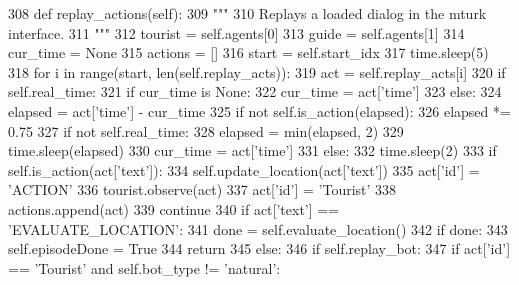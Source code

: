 \begin{DoxyCode}
308     \textcolor{keyword}{def }replay\_actions(self):
309         \textcolor{stringliteral}{"""}
310 \textcolor{stringliteral}{        Replays a loaded dialog in the mturk interface.}
311 \textcolor{stringliteral}{        """}
312         tourist = self.agents[0]
313         guide = self.agents[1]
314         cur\_time = \textcolor{keywordtype}{None}
315         actions = []
316         start = self.start\_idx
317         time.sleep(5)
318         \textcolor{keywordflow}{for} i \textcolor{keywordflow}{in} range(start, len(self.replay\_acts)):
319             act = self.replay\_acts[i]
320             \textcolor{keywordflow}{if} self.real\_time:
321                 \textcolor{keywordflow}{if} cur\_time \textcolor{keywordflow}{is} \textcolor{keywordtype}{None}:
322                     cur\_time = act[\textcolor{stringliteral}{'time'}]
323                 \textcolor{keywordflow}{else}:
324                     elapsed = act[\textcolor{stringliteral}{'time'}] - cur\_time
325                     \textcolor{keywordflow}{if} \textcolor{keywordflow}{not} self.is\_action(elapsed):
326                         elapsed *= 0.75
327                         \textcolor{keywordflow}{if} \textcolor{keywordflow}{not} self.real\_time:
328                             elapsed = min(elapsed, 2)
329                     time.sleep(elapsed)
330                     cur\_time = act[\textcolor{stringliteral}{'time'}]
331             \textcolor{keywordflow}{else}:
332                 time.sleep(2)
333             \textcolor{keywordflow}{if} self.is\_action(act[\textcolor{stringliteral}{'text'}]):
334                 self.update\_location(act[\textcolor{stringliteral}{'text'}])
335                 act[\textcolor{stringliteral}{'id'}] = \textcolor{stringliteral}{'ACTION'}
336                 tourist.observe(act)
337                 act[\textcolor{stringliteral}{'id'}] = \textcolor{stringliteral}{'Tourist'}
338                 actions.append(act)
339                 \textcolor{keywordflow}{continue}
340             \textcolor{keywordflow}{if} act[\textcolor{stringliteral}{'text'}] == \textcolor{stringliteral}{'EVALUATE\_LOCATION'}:
341                 done = self.evaluate\_location()
342                 \textcolor{keywordflow}{if} done:
343                     self.episodeDone = \textcolor{keyword}{True}
344                     \textcolor{keywordflow}{return}
345             \textcolor{keywordflow}{else}:
346                 \textcolor{keywordflow}{if} self.replay\_bot:
347                     \textcolor{keywordflow}{if} act[\textcolor{stringliteral}{'id'}] == \textcolor{stringliteral}{'Tourist'} \textcolor{keywordflow}{and} self.bot\_type != \textcolor{stringliteral}{'natural'}:

\end{DoxyCode}

